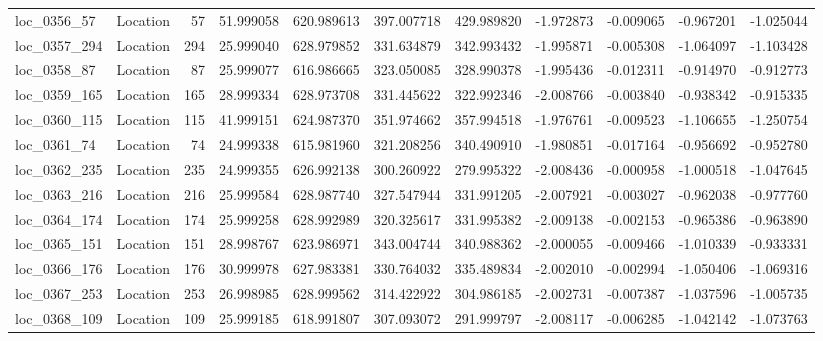\begin{tabular}{llrrrrrrrrr}
  loc_0356_57 &        Location &              57 &  51.999058 & 620.989613 &  397.007718 &    429.989820 &  -1.972873 &  -0.009065 &   -0.967201 &     -1.025044 \\
 loc_0357_294 &        Location &             294 &  25.999040 & 628.979852 &  331.634879 &    342.993432 &  -1.995871 &  -0.005308 &   -1.064097 &     -1.103428 \\
  loc_0358_87 &        Location &              87 &  25.999077 & 616.986665 &  323.050085 &    328.990378 &  -1.995436 &  -0.012311 &   -0.914970 &     -0.912773 \\
 loc_0359_165 &        Location &             165 &  28.999334 & 628.973708 &  331.445622 &    322.992346 &  -2.008766 &  -0.003840 &   -0.938342 &     -0.915335 \\
 loc_0360_115 &        Location &             115 &  41.999151 & 624.987370 &  351.974662 &    357.994518 &  -1.976761 &  -0.009523 &   -1.106655 &     -1.250754 \\
  loc_0361_74 &        Location &              74 &  24.999338 & 615.981960 &  321.208256 &    340.490910 &  -1.980851 &  -0.017164 &   -0.956692 &     -0.952780 \\
 loc_0362_235 &        Location &             235 &  24.999355 & 626.992138 &  300.260922 &    279.995322 &  -2.008436 &  -0.000958 &   -1.000518 &     -1.047645 \\
 loc_0363_216 &        Location &             216 &  25.999584 & 628.987740 &  327.547944 &    331.991205 &  -2.007921 &  -0.003027 &   -0.962038 &     -0.977760 \\
 loc_0364_174 &        Location &             174 &  25.999258 & 628.992989 &  320.325617 &    331.995382 &  -2.009138 &  -0.002153 &   -0.965386 &     -0.963890 \\
 loc_0365_151 &        Location &             151 &  28.998767 & 623.986971 &  343.004744 &    340.988362 &  -2.000055 &  -0.009466 &   -1.010339 &     -0.933331 \\
 loc_0366_176 &        Location &             176 &  30.999978 & 627.983381 &  330.764032 &    335.489834 &  -2.002010 &  -0.002994 &   -1.050406 &     -1.069316 \\
 loc_0367_253 &        Location &             253 &  26.998985 & 628.999562 &  314.422922 &    304.986185 &  -2.002731 &  -0.007387 &   -1.037596 &     -1.005735 \\
 loc_0368_109 &        Location &             109 &  25.999185 & 618.991807 &  307.093072 &    291.999797 &  -2.008117 &  -0.006285 &   -1.042142 &     -1.073763 \\

\end{tabular}

